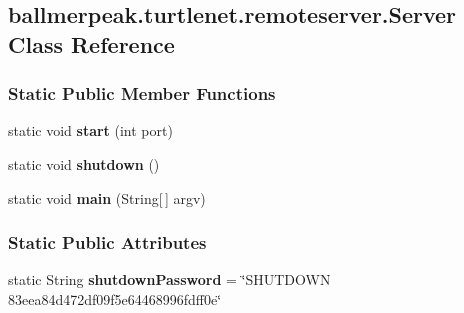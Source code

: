\hypertarget{classballmerpeak_1_1turtlenet_1_1remoteserver_1_1Server}{\subsection{ballmerpeak.\-turtlenet.\-remoteserver.\-Server Class Reference}
\label{classballmerpeak_1_1turtlenet_1_1remoteserver_1_1Server}
}
\subsubsection*{Static Public Member Functions}
\begin{DoxyCompactItemize}
\item 
\hypertarget{classballmerpeak_1_1turtlenet_1_1remoteserver_1_1Server_a48f2ebb138b28914f6351e81f84fa02c}{static void {\bfseries start} (int port)}\label{classballmerpeak_1_1turtlenet_1_1remoteserver_1_1Server_a48f2ebb138b28914f6351e81f84fa02c}

\item 
\hypertarget{classballmerpeak_1_1turtlenet_1_1remoteserver_1_1Server_a884654078b48154feac526fd94a9efe9}{static void {\bfseries shutdown} ()}\label{classballmerpeak_1_1turtlenet_1_1remoteserver_1_1Server_a884654078b48154feac526fd94a9efe9}

\item 
\hypertarget{classballmerpeak_1_1turtlenet_1_1remoteserver_1_1Server_a01aebeba4dcef19b48fda4be14b3f433}{static void {\bfseries main} (String\mbox{[}$\,$\mbox{]} argv)}\label{classballmerpeak_1_1turtlenet_1_1remoteserver_1_1Server_a01aebeba4dcef19b48fda4be14b3f433}

\end{DoxyCompactItemize}
\subsubsection*{Static Public Attributes}
\begin{DoxyCompactItemize}
\item 
\hypertarget{classballmerpeak_1_1turtlenet_1_1remoteserver_1_1Server_a1e2e63723daf1b2544af8d00be7ba4f0}{static String {\bfseries shutdown\-Password} = \char`\"{}S\-H\-U\-T\-D\-O\-W\-N 83eea84d472df09f5e64468996fdff0e\char`\"{}}\label{classballmerpeak_1_1turtlenet_1_1remoteserver_1_1Server_a1e2e63723daf1b2544af8d00be7ba4f0}

\end{DoxyCompactItemize}
